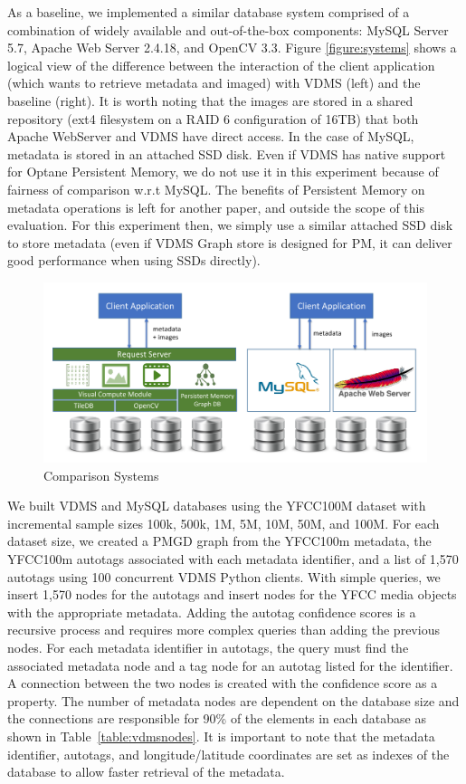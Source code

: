 As a baseline, we implemented a similar database system comprised of a
combination of widely available and out-of-the-box components: MySQL Server 5.7,
Apache Web Server 2.4.18, and OpenCV 3.3.
Figure \ref{figure:systems} shows a logical view of the difference between the
interaction of the client application (which wants to retrieve metadata and
imaged) with VDMS (left) and the baseline (right).
It is worth noting that the images are stored in a shared repository
(ext4 filesystem on a RAID 6 configuration of 16TB) that both Apache WebServer
and VDMS have direct access. In the case of MySQL, metadata is stored in an
attached SSD disk. Even if VDMS has native support for Optane Persistent Memory,
we do not use it in this experiment because of fairness of comparison w.r.t
MySQL. The benefits of Persistent Memory on metadata operations is left
for another paper, and outside the scope of this evaluation.
For this experiment then, we simply use a similar attached SSD disk to store
metadata (even if VDMS Graph store is designed for PM, it can deliver good
performance when using SSDs directly).

\begin{figure}[]
\centering
\includegraphics[width=\textwidth]{figures/comparison_system}
\caption{Comparison Systems}
\label{fig:systems}
\end{figure}

We built VDMS and MySQL databases using the YFCC100M dataset with
incremental sample sizes 100k, 500k, 1M, 5M, 10M, 50M, and 100M.
For each dataset size, we created a PMGD graph from the YFCC100m metadata,
the YFCC100m autotags associated with each metadata identifier,
and a list of 1,570 autotags using 100 concurrent VDMS Python clients.
With simple queries, we insert 1,570 nodes for the autotags and
insert nodes for the YFCC media objects with the appropriate metadata.
Adding the autotag confidence scores is a recursive process and
requires more complex queries than adding the previous nodes.
For each metadata identifier in autotags, the query must find
the associated metadata node and a tag node for an autotag listed
for the identifier.
A connection between the two nodes is created with
the confidence score as a property.
The number of metadata nodes are dependent on the database
size and the connections are responsible for 90\% of the elements
in each database as shown in Table~\ref{table:vdmsnodes}.
It is important to note that the metadata identifier, autotags,
and longitude/latitude coordinates are set as indexes of the
database to allow faster retrieval of the metadata.

